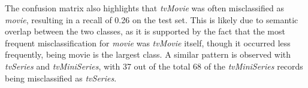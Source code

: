 The confusion matrix also highlights that \textit{tvMovie} was often misclassified as \textit{movie}, resulting in a recall of 0.26 on the test set. 
This is likely due to semantic overlap between the two classes, as it is supported by the fact that the most frequent misclassification 
for \textit{movie} was \textit{tvMovie} itself, though it occurred less frequently, being movie is the largest class.
A similar pattern is observed with \textit{tvSeries} and \textit{tvMiniSeries}, with 37 out of the total 68
of the \textit{tvMiniSeries} records being misclassified as \textit{tvSeries}.




